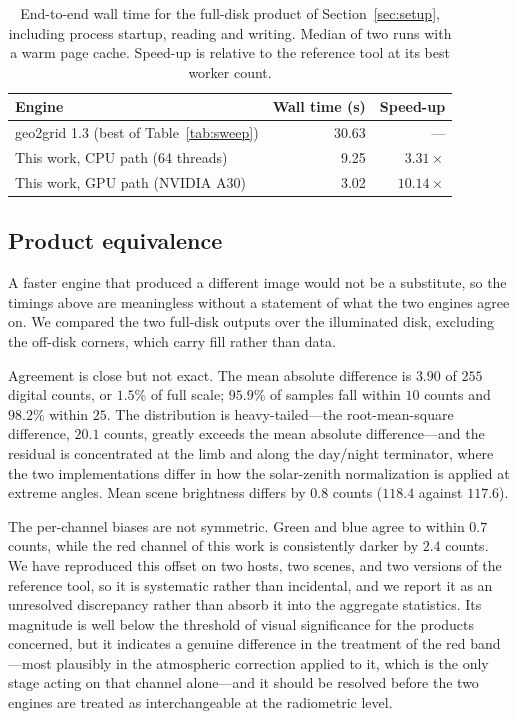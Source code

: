 \documentclass{ametsocV6.1}
\begin{document}
\begin{table}[t]
\caption{End-to-end wall time for the full-disk product of
Section~\ref{sec:setup}, including process startup, reading and writing.
Median of two runs with a warm page cache. Speed-up is relative to the
reference tool at its best worker count.}\label{tab:walltime}
\centering
\begin{tabular}{lrr}
\toprule
Engine & Wall time (s) & Speed-up \\
\midrule
geo2grid 1.3 (best of Table~\ref{tab:sweep}) & 30.63 & --- \\
This work, CPU path (64 threads) & 9.25 & $3.31\times$ \\
This work, GPU path (NVIDIA A30) & 3.02 & $10.14\times$ \\
\bottomrule
\end{tabular}
\end{table}

\subsection{Product equivalence}
\label{sec:equivalence}

A faster engine that produced a different image would not be a substitute, so
the timings above are meaningless without a statement of what the two engines
agree on. We compared the two full-disk outputs over the illuminated disk,
excluding the off-disk corners, which carry fill rather than data.

Agreement is close but not exact. The mean absolute difference is $3.90$ of
$255$ digital counts, or $1.5\%$ of full scale; $95.9\%$ of samples fall within
$10$ counts and $98.2\%$ within $25$. The distribution is heavy-tailed---the
root-mean-square difference, $20.1$ counts, greatly exceeds the mean absolute
difference---and the residual is concentrated at the limb and along the
day/night terminator, where the two implementations differ in how the
solar-zenith normalization is applied at extreme angles. Mean scene brightness
differs by $0.8$ counts ($118.4$ against $117.6$).

The per-channel biases are not symmetric. Green and blue agree to within $0.7$
counts, while the red channel of this work is consistently darker by $2.4$
counts. We have reproduced this offset on two hosts, two scenes, and two
versions of the reference tool, so it is systematic rather than incidental, and
we report it as an unresolved discrepancy rather than absorb it into the
aggregate statistics. Its magnitude is well below the threshold of visual
significance for the products concerned, but it indicates a genuine difference
in the treatment of the red band---most plausibly in the atmospheric correction
applied to it, which is the only stage acting on that channel alone---and it
should be resolved before the two engines are treated as interchangeable at the
radiometric level.
\end{document}
